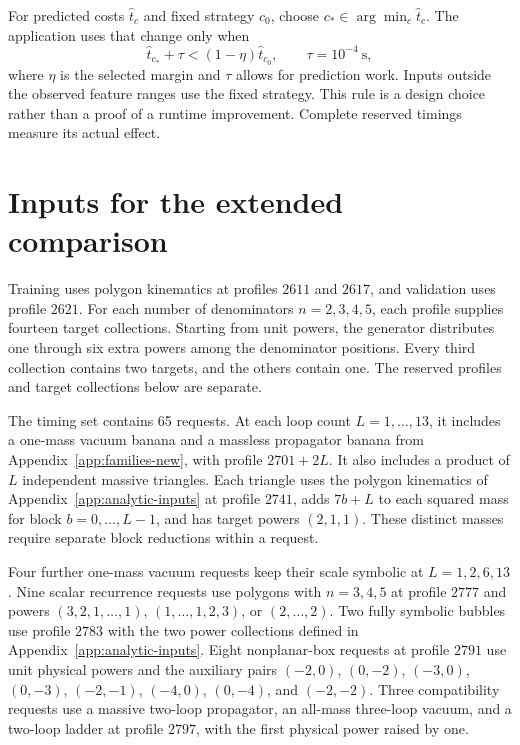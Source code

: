 For predicted costs $\widehat t_c$ and fixed strategy $c_0$, choose $c_*\in\arg\min_c\widehat t_c$. The application uses that change only when
\begin{equation}
 \widehat t_{c_*}+\tau < (1-\eta)\widehat t_{c_0},
 \qquad \tau=10^{-4}\ \mathrm{s},
 \label{eq:fast-margin}
\end{equation}
where $\eta$ is the selected margin and $\tau$ allows for prediction work. Inputs outside the observed feature ranges use the fixed strategy. This rule is a design choice rather than a proof of a runtime improvement. Complete reserved timings measure its actual effect.

\section{Inputs for the extended comparison}
\label{app:fast-inputs}
Training uses polygon kinematics at profiles $2611$ and $2617$, and validation uses profile $2621$. For each number of denominators $n=2,3,4,5$, each profile supplies fourteen target collections. Starting from unit powers, the generator distributes one through six extra powers among the denominator positions. Every third collection contains two targets, and the others contain one. The reserved profiles and target collections below are separate.

The timing set contains 65 requests. At each loop count $L=1,\ldots,13$, it includes a one-mass vacuum banana and a massless propagator banana from Appendix~\ref{app:families-new}, with profile $2701+2L$. It also includes a product of $L$ independent massive triangles. Each triangle uses the polygon kinematics of Appendix~\ref{app:analytic-inputs} at profile $2741$, adds $7b+L$ to each squared mass for block $b=0,\ldots,L-1$, and has target powers $(2,1,1)$. These distinct masses require separate block reductions within a request.

Four further one-mass vacuum requests keep their scale symbolic at $L=1,2,6,13$. Nine scalar recurrence requests use polygons with $n=3,4,5$ at profile $2777$ and powers $(3,2,1,\ldots,1)$, $(1,\ldots,1,2,3)$, or $(2,\ldots,2)$. Two fully symbolic bubbles use profile $2783$ with the two power collections defined in Appendix~\ref{app:analytic-inputs}. Eight nonplanar-box requests at profile $2791$ use unit physical powers and the auxiliary pairs $(-2,0)$, $(0,-2)$, $(-3,0)$, $(0,-3)$, $(-2,-1)$, $(-4,0)$, $(0,-4)$, and $(-2,-2)$. Three compatibility requests use a massive two-loop propagator, an all-mass three-loop vacuum, and a two-loop ladder at profile $2797$, with the first physical power raised by one.

